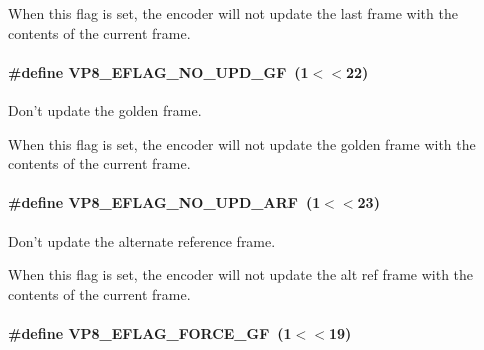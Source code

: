 \-When this flag is set, the encoder will not update the last frame with the contents of the current frame. \hypertarget{group__vp8__encoder_gab01d066c5236457d345ce1cab4c41d6b}{
\paragraph[{\-V\-P8\-\_\-\-E\-F\-L\-A\-G\-\_\-\-N\-O\-\_\-\-U\-P\-D\-\_\-\-G\-F}]{\setlength{\rightskip}{0pt plus 5cm}\#define {\bf \-V\-P8\-\_\-\-E\-F\-L\-A\-G\-\_\-\-N\-O\-\_\-\-U\-P\-D\-\_\-\-G\-F}~(1$<$$<$22)}}\label{group__vp8__encoder_gab01d066c5236457d345ce1cab4c41d6b}


\-Don't update the golden frame. 

\-When this flag is set, the encoder will not update the golden frame with the contents of the current frame. \hypertarget{group__vp8__encoder_ga1cff46a5287e73a620660030d40b9e6c}{
\paragraph[{\-V\-P8\-\_\-\-E\-F\-L\-A\-G\-\_\-\-N\-O\-\_\-\-U\-P\-D\-\_\-\-A\-R\-F}]{\setlength{\rightskip}{0pt plus 5cm}\#define {\bf \-V\-P8\-\_\-\-E\-F\-L\-A\-G\-\_\-\-N\-O\-\_\-\-U\-P\-D\-\_\-\-A\-R\-F}~(1$<$$<$23)}}\label{group__vp8__encoder_ga1cff46a5287e73a620660030d40b9e6c}


\-Don't update the alternate reference frame. 

\-When this flag is set, the encoder will not update the alt ref frame with the contents of the current frame. \hypertarget{group__vp8__encoder_gacb64c00adcb361f72a9a3028eb12f5ff}{
\paragraph[{\-V\-P8\-\_\-\-E\-F\-L\-A\-G\-\_\-\-F\-O\-R\-C\-E\-\_\-\-G\-F}]{\setlength{\rightskip}{0pt plus 5cm}\#define {\bf \-V\-P8\-\_\-\-E\-F\-L\-A\-G\-\_\-\-F\-O\-R\-C\-E\-\_\-\-G\-F}~(1$<$$<$19)}}\label{group__vp8__encoder_gacb64c00adcb361f72a9a3028eb12f5ff}


